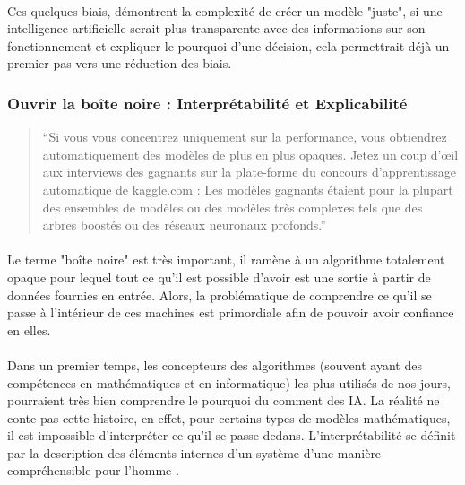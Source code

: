 \documentclass[10pt, french, a4paper]{report}
\begin{document}
\paragraph{}
Ces quelques biais, démontrent la complexité de créer un modèle "juste", si une intelligence artificielle serait plus transparente avec des informations sur son fonctionnement et expliquer le pourquoi d’une décision, cela permettrait déjà un premier pas vers une réduction des biais.

\subsubsection{Ouvrir la boîte noire : Interprétabilité et Explicabilité}
\label{subsec:explicabilite}

\begin{quotation}
  ``Si vous vous concentrez uniquement sur la performance, vous obtiendrez automatiquement des modèles de plus en plus opaques. Jetez un coup d'œil aux interviews des gagnants sur la plate-forme du concours d'apprentissage automatique de kaggle.com : Les modèles gagnants étaient pour la plupart des ensembles de modèles ou des modèles très complexes tels que des arbres boostés ou des réseaux neuronaux profonds.''
\end{quotation}

\paragraph{}
Le terme "boîte noire" est très important, il ramène à un algorithme totalement opaque pour lequel tout ce qu’il est possible d’avoir est une sortie à partir de données fournies en entrée. Alors, la problématique de comprendre ce qu’il se passe à l’intérieur de ces machines est primordiale afin de pouvoir avoir confiance en elles.

\paragraph{}
Dans un premier temps, les concepteurs des algorithmes (souvent ayant des compétences en mathématiques et en informatique) les plus utilisés de nos jours, pourraient très bien comprendre le pourquoi du comment des IA. La réalité ne conte pas cette histoire, en effet, pour certains types de modèles mathématiques, il est impossible d’interpréter ce qu’il se passe dedans. L’interprétabilité se définit par la description des éléments internes d’un système d’une manière compréhensible pour l’homme \citep{gilpin_explaining_2018}.
\end{document}
